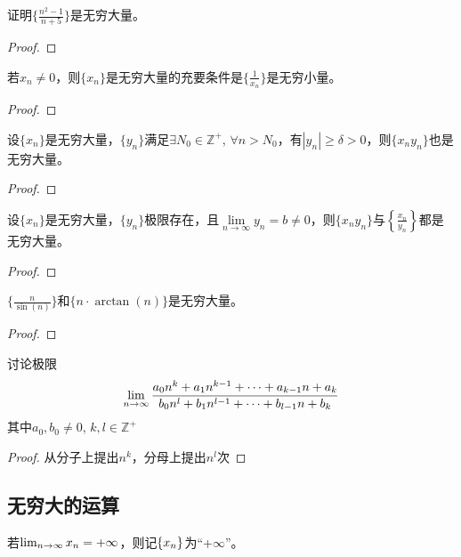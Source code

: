 \begin{proposition}
    证明$\{ \frac{n^2-1}{n+5} \}$是无穷大量。 
\end{proposition}
\begin{proof}
    
\end{proof}

\begin{lemma}\label{lemma:inverse}
    若$x_n \neq 0$，则$\{ x_n \}$是无穷大量的充要条件是$\{ \frac{1}{x_n} \}$是无穷小量。    
\end{lemma}
\begin{proof}

\end{proof}

\begin{lemma}
    设$\{ x_n \}$是无穷大量，$\{ y_n \}$满足$\exists N_0 \in \mathbb{Z}^+$, $\forall n > N_0$，有$| y_n | \ge \delta > 0$，则$\{ x_n y_n\}$也是无穷大量。
\end{lemma}
\begin{proof}
\end{proof}

\begin{lemma}
    设$\{ x_n \}$是无穷大量，$\{ y_n \}$极限存在，且$\lim\limits_{n \to \infty}y_n = b \ne 0$，则$\{ x_n y_n\}$与$\left\{ \frac{x_n}{y_n} \right\}$都是无穷大量。
\end{lemma}
\begin{proof}
\end{proof}

\begin{proposition}
    $\{ \frac{n}{\sin(n)}\}$和$\{ n \cdot \arctan(n)\}$是无穷大量。
\end{proposition}
\begin{proof}
\end{proof}

\begin{proposition}
    讨论极限
    \[ \lim_{n \to \infty} \frac{a_0 n^k + a_1 n^{k - 1} + \cdots + a_{k - 1} n + a_k}{b_0 n^l + b_1 n^{l - 1} + \cdots + b_{l - 1} n + b_k}\]
    其中$a_0, b_0 \ne 0$, $k, l \in \mathbb{Z}^+$
\end{proposition}
\begin{proof}
    从分子上提出$n^k$，分母上提出$n^l$次
\end{proof}
\subsection{无穷大的运算}
若$\lim_{n \to \infty } x_n = +\infty$，则记$\left\{ x_n\right\}$为``+$\infty$''。

